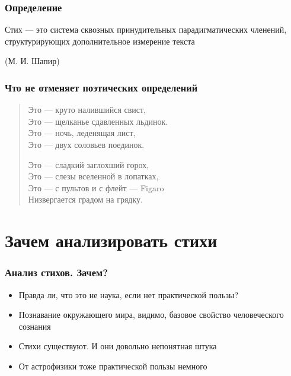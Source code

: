 \documentclass{beamer}
\begin{document}

\begin{frame}
\frametitle{Определение}

{\Large Стих — это система сквозных принудительных парадигматических членений, структурирующих дополнительное измерение текста}

\begin{flushleft}
(М. И. Шапир)
\end{flushleft}

\end{frame}


\begin{frame}
\frametitle{Что не отменяет поэтических определений}

\begin{verse}
Это — круто налившийся свист,\\
Это — щелканье сдавленных льдинок.\\
Это — ночь, леденящая лист,\\
Это — двух соловьев поединок.

Это — сладкий заглохший горох,\\
Это — слезы вселенной в лопатках,\\
Это — с пультов и с флейт — Figaro\\
Низвергается градом на грядку.
\end{verse}

\end{frame}


\section{Зачем анализировать стихи}\label{sec:main}



\begin{frame}
\frametitle{Анализ стихов. Зачем?}

\begin{itemize}
\item Правда ли, что это не наука, если нет практической пользы?
\end{itemize}

\begin{itemize}
\item Познавание окружающего мира, видимо, базовое свойство человеческого сознания
\item Стихи существуют. И они довольно непонятная штука
\item От астрофизики тоже практической пользы немного
\end{itemize}

\end{frame}
\end{document}
